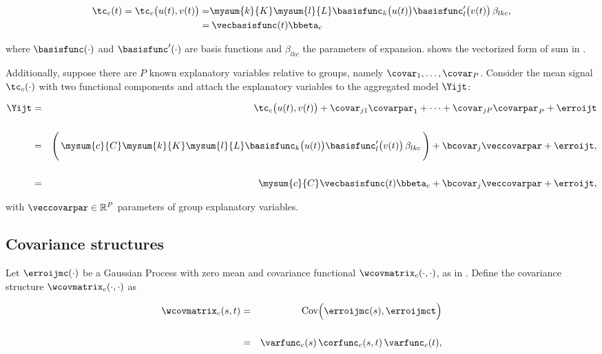 \begin{align}
  \tc_c(t) = 
  \tc_c \bigl( u(t), v(t) \bigr)
  =&
      \mysum{k}{K} \mysum{l}{L}
      \basisfunc_k \bigl( u(t)\bigr)
      \basisfunc^\prime_l \bigl( v(t)\bigr)
      \,
      \beta_{lkc}, \label{eq:surf}\\
  =&
    \:  \vecbasisfunc(t) \bbeta_c \label{eq:surfvec}  
\end{align}

\noindent where $\basisfunc(\cdot)$ and $\basisfunc^\prime(\cdot)$ are basis functions and $\beta_{lkc}$ the parameters of expansion.  shows the vectorized form of sum in .

Additionally, suppose there are $P$ known explanatory variables relative to groups, namely $\covar_1, \dots, \covar_P$. Consider the mean signal $\tc_c(\cdot)$ with two functional components and attach the explanatory variables to the aggregated model $\Yijt$:

\begin{eqnarray}
  \label{eq:surfmodel}
  \Yijt &=&
          \tc_c \bigl( u(t), v(t) \bigr) +
          \covar_{j1} \covarpar_1 +
          \dots +
          \covar_{jP} \covarpar_P +
          \erroijt \\[.5cm]
        &=&
          \Biggl(\,
          \mysum{c}{C}\mysum{k}{K} \mysum{l}{L}
          \basisfunc_k \bigl( u(t)\bigr)
          \basisfunc^\prime_l \bigl( v(t)\bigr)
          \,
          \beta_{lkc}
          \, \Biggr)
          +
          \bcovar_j \veccovarpar
          +
            \erroijt, \nonumber \\[.5cm]
        &=&
            \mysum{c}{C}
            \vecbasisfunc(t) \bbeta_c
            +
            \bcovar_j \veccovarpar
            +
            \erroijt, \nonumber
\end{eqnarray}

\noindent with $\veccovarpar \in \mathbb{R}^P$ parameters of group explanatory variables.

\subsection{Covariance structures} \label{sec:covstructures}

Let $\erroijmc(\cdot)$ be a Gaussian Process with zero mean and covariance functional $\wcovmatrix_c(\cdot,\cdot)$, as in . Define the covariance structure $\wcovmatrix_c(\cdot,\cdot)$ as

\begin{eqnarray}
  \label{eq:covstructure}
  \wcovmatrix_c(s,t)
  &=&
      \text{Cov} \Bigl(
      \erroijmc(s),
      \erroijmct
      \Bigr) \nonumber \\[.5cm]
  &=&
      \varfunc_c(s) \,
      \corfunc_c(s,t) \,
      \varfunc_c(t),
\end{eqnarray}

